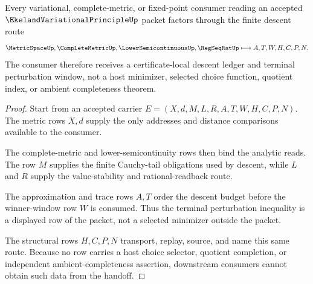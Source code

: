 \begin{theorem}
\label{thm:ekeland-variational-principle-metric-descent-handoff}
Every variational, complete-metric, or fixed-point consumer reading an accepted $\EkelandVariationalPrincipleUp$ packet factors through the finite descent route
$$
\MetricSpaceUp,\CompleteMetricUp,\LowerSemicontinuousUp,\RegSeqRatUp
\longmapsto
A,T,W,H,C,P,N .
$$
The consumer therefore receives a certificate-local descent ledger and terminal perturbation window, not a host minimizer, selected choice function, quotient index, or ambient completeness theorem.
\end{theorem}
\begin{proof}
Start from an accepted carrier $E=(X,d,M,L,R,A,T,W,H,C,P,N)$. The metric rows $X,d$ supply the only addresses and distance comparisons available to the consumer.

The complete-metric and lower-semicontinuity rows then bind the analytic reads. The row $M$ supplies the finite Cauchy-tail obligations used by descent, while $L$ and $R$ supply the value-stability and rational-readback route.

The approximation and trace rows $A,T$ order the descent budget before the winner-window row $W$ is consumed. Thus the terminal perturbation inequality is a displayed row of the packet, not a selected minimizer outside the packet.

The structural rows $H,C,P,N$ transport, replay, source, and name this same route. Because no row carries a host choice selector, quotient completion, or independent ambient-completeness assertion, downstream consumers cannot obtain such data from the handoff.
\end{proof}

